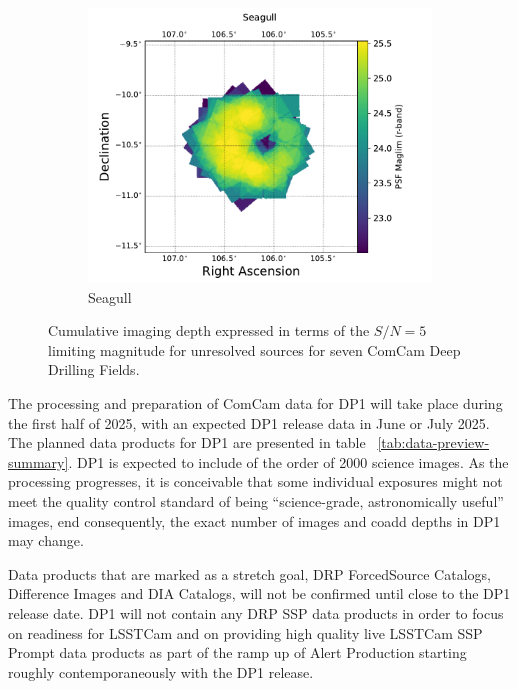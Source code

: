 \begin{figure}[htbp]
\begin{subfigure}[b]{0.3\textwidth}
        \label{fig:img7}
    \end{subfigure}
    \hfill
    \begin{subfigure}[b]{0.3\textwidth}
        \centering
        \includegraphics[width=\textwidth]{figures/comcam_psf_maglim_seagull_r.pdf}
        \caption{Seagull}
        \label{fig:img8}
    \end{subfigure}
     \caption{Cumulative imaging depth expressed in terms of the $S/N=5$ limiting magnitude for unresolved sources for seven ComCam Deep Drilling Fields.}
     \label{fig:dp1_fields_psf_maglim}
\end{figure}

The  processing and preparation of ComCam data for DP1 will take place during the first half of 2025, with an expected DP1 release data in June or July 2025. 
The planned data products for DP1 are presented in table~ \ref{tab:data-preview-summary}. 
DP1 is expected to include of the order of 2000 science images.
As the processing progresses, it is conceivable that some individual exposures might not meet the quality control standard of being “science-grade, astronomically useful” images, end consequently, the exact number of images  and coadd depths in DP1 may change. 

Data products that are marked as a stretch goal, DRP ForcedSource Catalogs, Difference Images and DIA Catalogs,  will not be confirmed until close to the DP1 release date. 
DP1 will not contain any DRP  SSP data products in order to focus on readiness for LSSTCam and on providing high quality live LSSTCam SSP Prompt data products as part of the ramp up of Alert Production starting roughly contemporaneously with the DP1 release.


